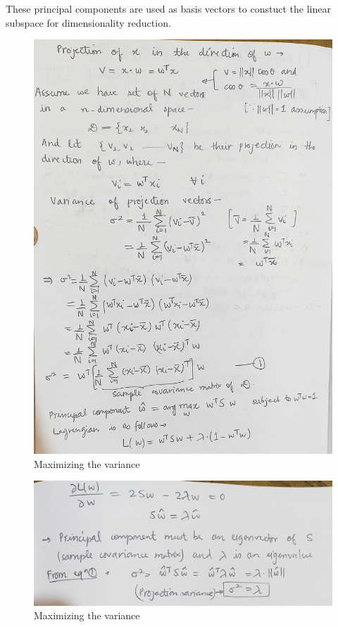 \documentclass[12pt,reqno]{amsart}
\theoremstyle{plain}
\theoremstyle{definition}
\begin{document}
\par These principal components are used as basis vectors to constuct the linear subspace for dimensionality reduction.
\begin{figure}[!ht]
    \centerline{\includegraphics[scale=.17]{ assets/1000124291.jpg}}
    \caption{Maximizing the variance}
    \label{fig1}
\end{figure}
\begin{figure}[!ht]
    \centerline{\includegraphics[scale=.17]{ assets/1000124289.jpg}}
    \caption{Maximizing the variance}
    \label{fig2}
\end{figure}
\end{document}
